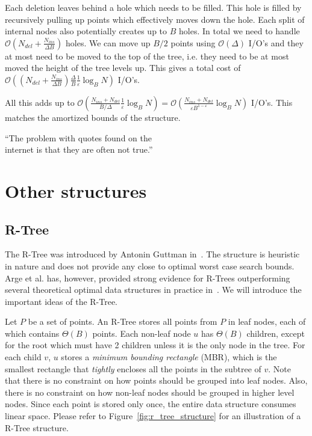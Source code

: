 \documentclass[twoside,11pt,openright]{report}
\def \epsilon {\varepsilon}
\begin{document}
Each deletion leaves behind a hole which needs to be filled. This hole is filled by recursively pulling up points which effectively moves down the hole. Each split of internal nodes also potentially creates up to $B$ holes.
In total we need to handle $\mathcal{O}\left(N_{del} + \frac{N_{ins}}{\Delta B}\right)$ holes. We can move up $B/2$ points using $\mathcal{O}(\Delta)$ I/O's and they at most need to be moved to the top of the tree, i.e. they need to be at most moved the height of the tree levels up. This gives a total cost of $\mathcal{O}\left(\left(N_{del} + \frac{N_{ins}}{\Delta B}\right)\frac{\Delta}{B}\frac{1}{\epsilon} \log_B N\right)$ I/O's.

All this adds up to $\mathcal{O}\left(\frac{N_{ins}+N_{del}}{B/\Delta} \frac{1}{\epsilon} \log_B N\right) = \mathcal{O}\left(\frac{N_{ins}+N_{del}}{\epsilon B^{1-\epsilon}} \log_B N\right)$ I/O's. This matches the amortized bounds of the structure.

\begin{savequote}[0.5\textwidth]
``The problem with quotes found on the\\internet is that they are often not true.''
\end{savequote}
\chapter{Other structures}
\label{chp:other_structures}
\section{R-Tree}

The R-Tree was introduced by Antonin Guttman in~\cite{Guttman:1984:RDI:602259.602266}. The structure is heuristic in nature and does not provide any close to optimal worst case search bounds. Arge et al. has, however, provided strong evidence for R-Trees outperforming several theoretical optimal data structures in practice in~\cite{Arge:2008:PRP:1328911.1328920}. We will introduce the important ideas of the R-Tree.

Let $P$ be a set of points. An R-Tree stores all points from $P$ in leaf nodes, each of which contains $\Theta(B)$ points. Each non-leaf node $u$ has $\Theta(B)$ children, except for the root which must have 2 children unless it is the only node in the tree. For each child $v$, $u$ stores a \textit{minimum bounding rectangle} (MBR), which is the smallest rectangle that \textit{tightly} encloses all the points in the subtree of $v$. Note that there is no constraint on how points should be grouped into leaf nodes. Also, there is no constraint on how non-leaf nodes should be grouped in higher level nodes. Since each point is stored only once, the entire data structure consumes linear space. Please refer to Figure~\ref{fig:r_tree_structure} for an illustration of a R-Tree structure.
\end{document}
